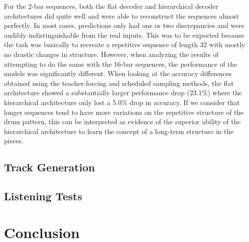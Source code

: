 \documentclass[10pt,twocolumn]{article}
\begin{document}
For the 2-bar sequences, both the flat decoder and hierarchical decoder architectures did quite well and were able to reconstruct the sequences almost perfectly. In most cases, predictions only had one or two discrepancies and were audibly indistinguishable from the real inputs. This was to be expected because the task was basically to recreate a repetitive sequence of length 32 with mostly no drastic changes in structure. However, when analyzing the results of attempting to do the same with the 16-bar sequences, the performance of the models was significantly different. When looking at the accuracy differences obtained using the teacher-forcing and scheduled sampling methods, the flat architecture showed a substantially larger performance drop (23.1\%) where the hierarchical architecture only lost a 5.0\% drop in accuracy. If we consider that longer sequences tend to have more variations on the repetitive structure of the drum pattern, this can be interpreted as evidence of the superior ability of the hierarchical architecture to learn the concept of a long-term structure in the pieces.

\subsection{Track Generation}

\subsection{Listening Tests}

\section{Conclusion}

\pagebreak



\end{document}
